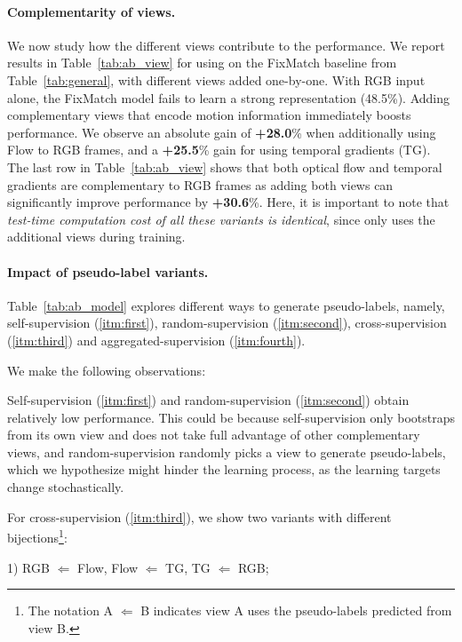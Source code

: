 \documentclass[10pt,twocolumn,letterpaper]{article}
\begin{document}
\paragraph{{Complementarity of views.}}
We now study how the different views contribute to the performance. We report results in Table~\ref{tab:ab_view} for using \oursshort on the FixMatch baseline from Table~\ref{tab:general}, with different views added one-by-one.
With RGB input alone, the FixMatch model fails to learn a strong representation (48.5\%). Adding complementary views that encode motion information immediately boosts performance. 
We observe an absolute gain of \textbf{+28.0}\% when additionally using Flow to RGB frames, and a \textbf{+25.5}\% gain for using temporal gradients (TG). The last row in Table~\ref{tab:ab_view} shows that both optical flow and temporal gradients are complementary to RGB frames as adding both views can significantly improve performance by \textbf{+30.6}\%. Here, it is important to note that \textit{test-time computation cost of all these variants is identical}, since \oursshort only uses the additional views during training. 



\paragraph{Impact of pseudo-label variants.}
Table~\ref{tab:ab_model} explores different ways to generate pseudo-labels, namely, self-supervision (\ref{itm:first}), random-supervision (\ref{itm:second}), cross-supervision (\ref{itm:third}) and aggregated-supervision (\ref{itm:fourth}).

We make the following observations: \vspace{2pt}

Self-supervision (\ref{itm:first}) and random-supervision (\ref{itm:second}) obtain relatively low performance. This could be because self-supervision only bootstraps from its own view and does not take full advantage of other complementary views, and  random-supervision randomly picks a view to generate pseudo-labels, which we hypothesize might hinder the learning process, as the  learning targets change stochastically.

For cross-supervision (\ref{itm:third}), we show two variants with different bijections\footnote{
The notation A $\Leftarrow$ B indicates view A uses the pseudo-labels predicted from view B. }: 

1) RGB  $\Leftarrow$ Flow,  
Flow  $\Leftarrow$ TG, 
TG  $\Leftarrow$ RGB;
\end{document}
